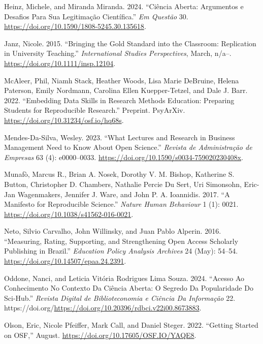 \documentclass[
  a4paper,
]{article}
\newlength{\cslhangindent}
\newenvironment{CSLReferences}[2] %
 {\begin{list}{}{%
  \setlength{\itemindent}{0pt}
  \setlength{\leftmargin}{0pt}
  \setlength{\parsep}{0pt}
  \ifodd #1
   \setlength{\leftmargin}{\cslhangindent}
   \setlength{\itemindent}{-1\cslhangindent}
  \fi
  \setlength{\itemsep}{#2\baselineskip}}}
 {\end{list}}
\begin{document}
\begin{CSLReferences}{1}{0}
Heinz, Michele, and Miranda Miranda. 2024. {``Ci{ê}ncia {Aberta}:
Argumentos e Desafios Para Sua Legitima{ç}{ã}o Cient{í}fica.''} \emph{Em
Quest{ã}o} 30. \url{https://doi.org/10.1590/1808-5245.30.135618}.

Janz, Nicole. 2015. {``Bringing the {Gold Standard} into the
{Classroom}: {Replication} in {University Teaching}.''}
\emph{International Studies Perspectives}, March, n/a--.
\url{https://doi.org/10.1111/insp.12104}.

McAleer, Phil, Niamh Stack, Heather Woods, Lisa Marie DeBruine, Helena
Paterson, Emily Nordmann, Carolina Ellen Kuepper-Tetzel, and Dale J.
Barr. 2022. {``Embedding {Data Skills} in {Research Methods Education}:
{Preparing Students} for {Reproducible Research}.''} Preprint. PsyArXiv.
\url{https://doi.org/10.31234/osf.io/hq68s}.

Mendes-Da-Silva, Wesley. 2023. {``What {Lectures} and {Research} in
{Business Management Need} to {Know About Open Science}.''}
\emph{Revista de Administra{ç}{ã}o de Empresas} 63 (4): e0000--0033.
\url{https://doi.org/10.1590/s0034-759020230408x}.

Munafò, Marcus R., Brian A. Nosek, Dorothy V. M. Bishop, Katherine S.
Button, Christopher D. Chambers, Nathalie Percie Du Sert, Uri Simonsohn,
Eric-Jan Wagenmakers, Jennifer J. Ware, and John P. A. Ioannidis. 2017.
{``A Manifesto for Reproducible Science.''} \emph{Nature Human
Behaviour} 1 (1): 0021. \url{https://doi.org/10.1038/s41562-016-0021}.

Neto, Silvio Carvalho, John Willinsky, and Juan Pablo Alperin. 2016.
{``Measuring, Rating, Supporting, and Strengthening Open Access
Scholarly Publishing in {Brazil}.''} \emph{Education Policy Analysis
Archives} 24 (May): 54--54. \url{https://doi.org/10.14507/epaa.24.2391}.

Oddone, Nanci, and Leticia Vitória Rodrigues Lima Souza. 2024. {``Acesso
Ao Conhecimento No Contexto Da Ciência Aberta: O Segredo Da Popularidade
Do Sci-Hub.''} \emph{Revista Digital de Biblioteconomia e Ciência Da
Informação} 22.
https://doi.org/\url{https://doi.org/10.20396/rdbci.v22i00.8673883}.

Olson, Eric, Nicole Pfeiffer, Mark Call, and Daniel Steger. 2022.
{``Getting Started on OSF,''} August.
\url{https://doi.org/10.17605/OSF.IO/YAQE8}.


\end{CSLReferences}
\end{document}
